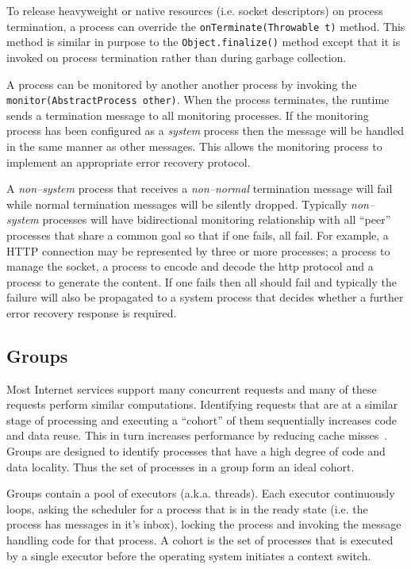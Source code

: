 \documentclass[conference]{IEEEtran}
\begin{document}
To release heavyweight or native resources (i.e. socket descriptors) on process termination, a process can override the \verb+onTerminate(Throwable t)+ method. This method is similar in purpose to the \verb+Object.finalize()+ method except that it is invoked on process termination rather than during garbage collection. 

A process can be monitored by another another process by invoking the \verb+monitor(AbstractProcess other)+. When the process terminates, the runtime sends a termination message to all monitoring processes. If the monitoring process has been configured as a \emph{system} process then the message will be handled in the same manner as other messages. This allows the monitoring process to implement an appropriate error recovery protocol.

A \emph{non--system} process that receives a \emph{non--normal} termination message will fail while normal termination messages will be silently dropped. Typically \emph{non--system} processes will have bidirectional monitoring relationship with all ``peer'' processes that share a common goal so that if one fails, all fail. For example, a HTTP connection may be represented by three or more processes; a process to manage the socket, a process to encode and decode the http protocol and a process to generate the content. If one fails then all should fail and typically the failure will also be propagated to a system process that decides whether a further error recovery response is required.

\subsection{Groups}
\label{section:Groups}

Most Internet services support many concurrent requests and many of these requests perform similar computations. Identifying requests that are at a similar stage of processing and executing a ``cohort'' of them sequentially increases code and data reuse. This in turn increases performance by reducing cache misses~\cite{Larus:2002:Cohort,welsh03Adaptive}. Groups are designed to identify processes that have a high degree of code and data locality. Thus the set of processes in a group form an ideal cohort.

Groups contain a pool of executors (a.k.a. threads). Each executor continuously loops, asking the scheduler for a process that is in the ready state (i.e. the process has messages in it's inbox), locking the process and invoking the message handling code for that process. A cohort is the set of processes that is executed by a single executor before the operating system initiates a context switch.
\end{document}
